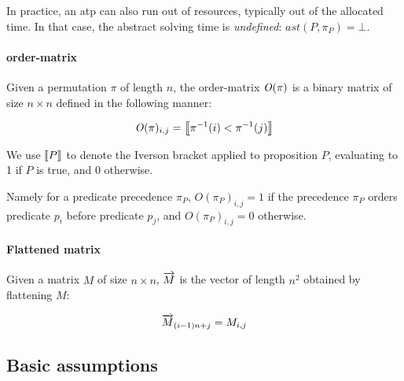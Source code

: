 In practice, an \gls{atp} can also run out of resources, typically out of the allocated time.
In that case, the abstract solving time is \emph{undefined}: \(\mathit{ast}(P,\pi_P) = \bot\).

\newpage

\paragraph{\Gls{order-matrix}}
Given a permutation \(\pi\) of length \(n\),
the \gls{order-matrix} \(\operatorname{\mathit{O}}(\pi)\) is a binary matrix of size \(n \times n\)
defined in the following manner:

\begin{align*}
\operatorname{\mathit{O}}(\pi)_{i, j} = \left \llbracket \pi^{-1}(i) < \pi^{-1}(j) \right \rrbracket
\end{align*}

We use \(\left \llbracket P \right \rrbracket\) to denote the Iverson bracket \cite{Iverson1962} applied to proposition \(P\),
evaluating to 1 if \(P\) is true, and 0 otherwise.

Namely for a predicate precedence \(\pi_P\), \(O(\pi_P)_{i, j} = 1\) if
the precedence \(\pi_P\) orders predicate \(p_i\) before predicate \(p_j\),
and \(O(\pi_P)_{i, j} = 0\) otherwise.

\paragraph{Flattened matrix}
Given a matrix \(M\) of size \(n \times n\),
\(\overrightarrow{M}\) is the vector of length \(n^2\) obtained by flattening \(M\):

\begin{align*}
\overrightarrow{M}_{(i - 1) n + j} = M_{i, j}
\end{align*}


\subsection{Basic assumptions}


